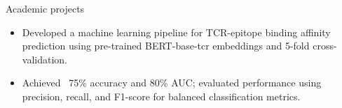 \documentclass{resume}
\begin{document}
\begin{experienceSection}{Academic projects}
    \projectItem[
        title=TCR-Epitope Binding Affinity Prediction,
        duration={Oct 2024 - Nov 2024},
    ]
    \begin{itemize}
        \vspace{-0.5em}
        \itemsep -6pt {}
        \item Developed a machine learning pipeline for TCR-epitope binding affinity prediction using pre-trained BERT-base-tcr embeddings and 5-fold cross-validation.
        \item Achieved ~75\% accuracy and 80\% AUC; evaluated performance using precision, recall, and F1-score for balanced classification metrics.
    \end{itemize}
    
\end{experienceSection}
\end{document}
